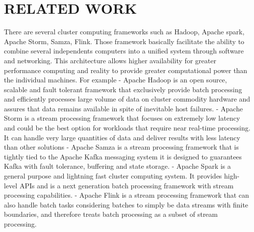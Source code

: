 \section{RELATED WORK}\label{sec:related}

There are several cluster computing frameworks such as Hadoop, Apache spark, Apache Storm, Samza, Flink. Those framework basically facilitate the ability to combine several independents computers into a unified system through software and networking. This architecture allows higher availability for greater performance computing and reality to provide greater computational power than the individual machines.   
For example 
-	Apache Hadoop is an open source, scalable and fault tolerant framework that exclusively provide batch processing and efficiently processes large volume of data on cluster commodity hardware and assures that data remains available in spite of inevitable host failures. 
-	Apache Storm is a stream processing framework that focuses on extremely low latency and could be the best option for workloads that require near real-time processing. It can handle very large quantities of data and deliver results with less latency than other solutions  
-	Apache Samza is a stream processing framework that is tightly tied to the Apache Kafka messaging system it is designed to guarantees Kafka with fault tolerance, buffering and state storage.
-	Apache Spark is a general purpose and lightning fast cluster computing system. It provides high-level APIs and is a next generation batch processing framework with stream processing capabilities.
-	Apache Flink is a stream processing framework that can also handle batch tasks considering batches to simply be data streams with finite boundaries, and therefore treats batch processing as a subset of stream processing.
